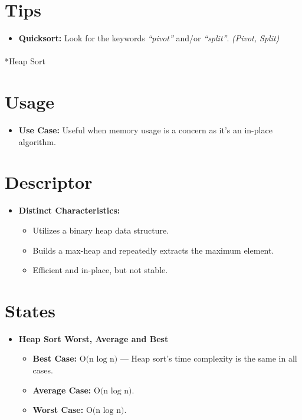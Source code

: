\documentclass[
  letterpaper,
  DIV=11,
  numbers=noendperiod]{scrreprt}
\makeatletter
\let\oldparagraph\paragraph
\renewcommand{\paragraph}{
    \@ifstar
      \xxxParagraphStar
      \xxxParagraphNoStar
  }
\newcommand{\xxxParagraphStar}[1]{\oldparagraph*{#1}\mbox{}}
\newcommand{\xxxParagraphNoStar}[1]{\oldparagraph{#1}\mbox{}}
\providecommand{\tightlist}{%
  \setlength{\itemsep}{0pt}\setlength{\parskip}{0pt}}
\makeatother
\begin{document}
\section{Tips}

\begin{itemize}
\tightlist
\item
  \textbf{Quicksort:} Look for the keywords \emph{``pivot''} and/or
  \emph{``split''}. \emph{(Pivot, Split)}
\end{itemize}

\paragraph*{Heap Sort}\label{heap-sort}

\section{Usage}

\begin{itemize}
\tightlist
\item
  \textbf{Use Case:} Useful when memory usage is a concern as it's an
  in-place algorithm.
\end{itemize}

\section{Descriptor}

\begin{itemize}
\item
  \textbf{Distinct Characteristics:}

  \begin{itemize}
  \tightlist
  \item
    Utilizes a binary heap data structure.
  \item
    Builds a max-heap and repeatedly extracts the maximum element.
  \item
    Efficient and in-place, but not stable.
  \end{itemize}
\end{itemize}

\section{States}

\begin{itemize}
\item
  \textbf{Heap Sort Worst, Average and Best}

  \begin{itemize}
  \tightlist
  \item
    \textbf{Best Case:} \(\text{O(n ⁡log⁡ n)}\) --- Heap sort's time
    complexity is the same in all cases.
  \item
    \textbf{Average Case:} \(\text{O(n ⁡log⁡ n)}\).
  \item
    \textbf{Worst Case:} \(\text{O(n ⁡log⁡ n)}\).
  \end{itemize}
\end{itemize}
\end{document}
